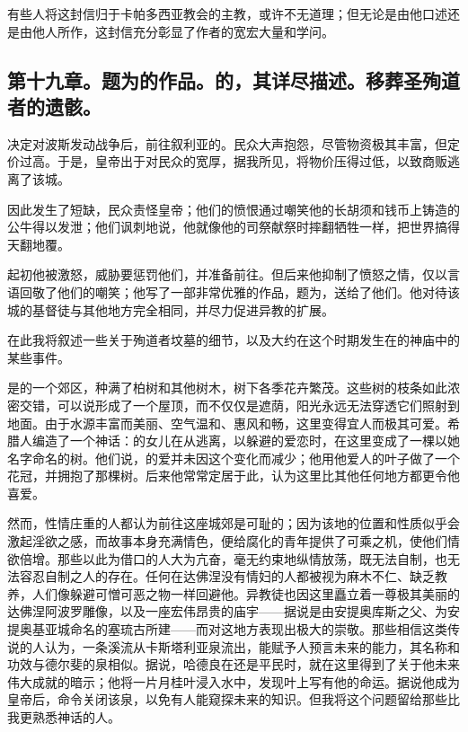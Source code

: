 有些人将这封信归于卡帕多西亚教会的主教，或许不无道理；但无论是由他口述还是由他人所作，这封信充分彰显了作者的宽宏大量和学问。\par


\subsection{第十九章。题为的作品。的，其详尽描述。移葬圣殉道者的遗骸。}

决定对波斯发动战争后，前往叙利亚的。民众大声抱怨，尽管物资极其丰富，但定价过高。于是，皇帝出于对民众的宽厚，据我所见，将物价压得过低，以致商贩逃离了该城。\newline{}\par

因此发生了短缺，民众责怪皇帝；他们的愤恨通过嘲笑他的长胡须和钱币上铸造的公牛得以发泄；他们讽刺地说，他就像他的司祭献祭时摔翻牺牲一样，把世界搞得天翻地覆。\par

起初他被激怒，威胁要惩罚他们，并准备前往。但后来他抑制了愤怒之情，仅以言语回敬了他们的嘲笑；他写了一部非常优雅的作品，题为，送给了他们。他对待该城的基督徒与其他地方完全相同，并尽力促进异教的扩展。\par

在此我将叙述一些关于殉道者坟墓的细节，以及大约在这个时期发生在的神庙中的某些事件。\par

是的一个郊区，种满了柏树和其他树木，树下各季花卉繁茂。这些树的枝条如此浓密交错，可以说形成了一个屋顶，而不仅仅是遮荫，阳光永远无法穿透它们照射到地面。由于水源丰富而美丽、空气温和、惠风和畅，这里变得宜人而极其可爱。希腊人编造了一个神话：的女儿在从逃离，以躲避的爱恋时，在这里变成了一棵以她名字命名的树。他们说，的爱并未因这个变化而减少；他用他爱人的叶子做了一个花冠，并拥抱了那棵树。后来他常常定居于此，认为这里比其他任何地方都更令他喜爱。\par

然而，性情庄重的人都认为前往这座城郊是可耻的；因为该地的位置和性质似乎会激起淫欲之感，而故事本身充满情色，便给腐化的青年提供了可乘之机，使他们情欲倍增。那些以此为借口的人大为亢奋，毫无约束地纵情放荡，既无法自制，也无法容忍自制之人的存在。任何在达佛涅没有情妇的人都被视为麻木不仁、缺乏教养，人们像躲避可憎可恶之物一样回避他。异教徒也因这里矗立着一尊极其美丽的达佛涅阿波罗雕像，以及一座宏伟昂贵的庙宇——据说是由安提奥库斯之父、为安提奥基亚城命名的塞琉古所建——而对这地方表现出极大的崇敬。那些相信这类传说的人认为，一条溪流从卡斯塔利亚泉流出，能赋予人预言未来的能力，其名称和功效与德尔斐的泉相似。据说，哈德良在还是平民时，就在这里得到了关于他未来伟大成就的暗示；他将一片月桂叶浸入水中，发现叶上写有他的命运。据说他成为皇帝后，命令关闭该泉，以免有人能窥探未来的知识。但我将这个问题留给那些比我更熟悉神话的人。\par

